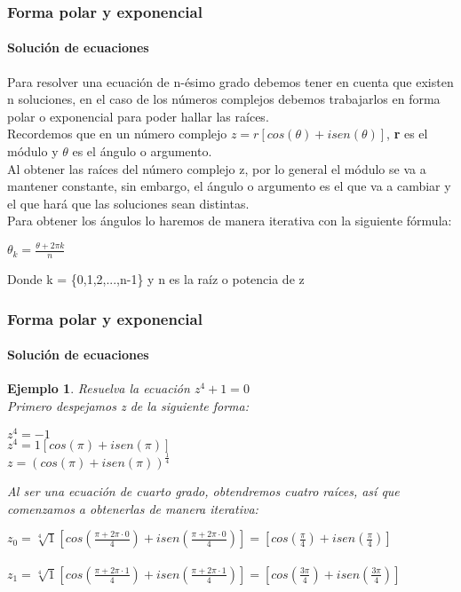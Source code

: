 \documentclass[11pt]{beamer}
\newtheorem{ejem}{Ejemplo}
\begin{document}
\begin{frame}
\frametitle{Forma polar y exponencial}
\framesubtitle{Solución de ecuaciones}
Para resolver una ecuación de n-ésimo grado debemos tener en cuenta que existen n soluciones, en el caso de los números complejos debemos trabajarlos en forma polar o exponencial para poder hallar las raíces. \\
Recordemos que en un número complejo $z = r[cos(\theta)+isen(\theta)]$, \textbf{r} es el módulo y \textbf{$\theta$} es el ángulo o argumento. \\
Al obtener las raíces del número complejo z, por lo general el módulo se va a mantener constante, sin embargo, el ángulo o argumento es el que va a cambiar y el que hará que las soluciones sean distintas.\\
Para obtener los ángulos lo haremos de manera iterativa con la siguiente fórmula:\\
\begin{center}
$\theta_k = \frac{\theta + 2\pi k}{n}$\\
\end{center}
Donde k = \{0,1,2,...,n-1\} y n es la raíz o potencia de z
\end{frame}

\begin{frame}
\frametitle{Forma polar y exponencial}
\framesubtitle{Solución de ecuaciones}
\begin{ejem}
Resuelva la ecuación $z^4+1=0$\\
Primero despejamos z de la siguiente forma:\\
\begin{center}
$z^4=-1$\\
$z^4= 1[cos(\pi)+isen(\pi)]$\\
$z = (cos(\pi)+isen(\pi))^\frac{1}{4}$\\
\end{center}
Al ser una ecuación de cuarto grado, obtendremos cuatro raíces, así que comenzamos a obtenerlas de manera iterativa:\\
\begin{center}
$z_0 = \sqrt[4]{1}[cos(\frac{\pi + 2\pi \cdot 0}{4})+isen(\frac{\pi + 2\pi \cdot 0}{4})] = 
[cos(\frac{\pi}{4})+isen(\frac{\pi}{4})]$\\ \hspace{0cm} \\
$z_1 = \sqrt[4]{1}[cos(\frac{\pi + 2\pi \cdot 1}{4})+isen(\frac{\pi + 2\pi \cdot 1}{4})] = 
[cos(\frac{3\pi}{4})+isen(\frac{3\pi}{4})]$\\ \hspace{0cm} \\
\end{center}
\end{ejem}
\end{frame}
\end{document}
